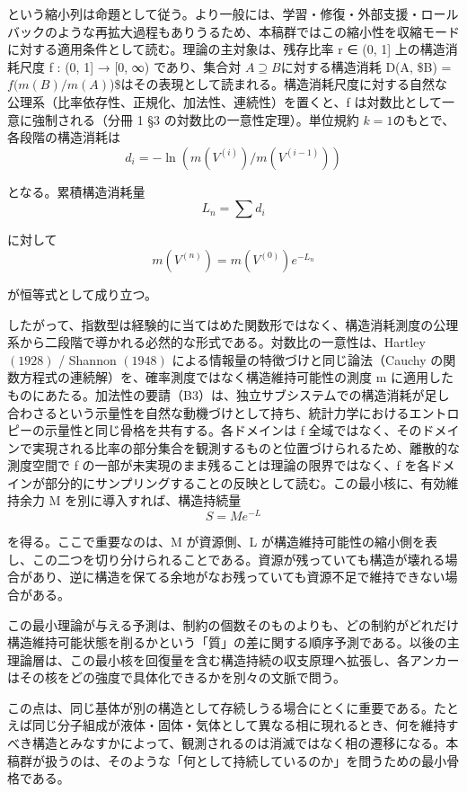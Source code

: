 \documentclass[12pt,a4paper]{article}
\begin{document}
という縮小列は命題として従う。より一般には、学習・修復・外部支援・ロールバックのような再拡大過程もありうるため、本稿群ではこの縮小性を収縮モードに対する適用条件として読む。理論の主対象は、残存比率 r ∈ (0, 1{]} 上の構造消耗尺度 f : (0, 1{]} → {[}0, ∞) であり、集合対 \(A \supseteq B\)に対する構造消耗 D(A, \$B) = \(f(m(B)/m(A)\))\$はその表現として読まれる。構造消耗尺度に対する自然な公理系（比率依存性、正規化、加法性、連続性）を置くと、f は対数比として一意に強制される（分冊 1 §3 の対数比の一意性定理）。単位規約 \(k = 1\)のもとで、各段階の構造消耗は \[
d_{i} = -\ln( m(V^{(i)}) / m(V^{(i-1)}) )
\]

となる。累積構造消耗量 \[
L_{n} = \sum d_{i}
\]

に対して \[
m(V^{(n)}) = m(V^{(0)}) e^{-L_{n}}
\]

が恒等式として成り立つ。

したがって、指数型は経験的に当てはめた関数形ではなく、構造消耗測度の公理系から二段階で導かれる必然的な形式である。対数比の一意性は、Hartley \((1928)\) / Shannon \((1948)\) による情報量の特徴づけと同じ論法（Cauchy の関数方程式の連続解）を、確率測度ではなく構造維持可能性の測度 m に適用したものにあたる。加法性の要請（B3）は、独立サブシステムでの構造消耗が足し合わさるという示量性を自然な動機づけとして持ち、統計力学におけるエントロピーの示量性と同じ骨格を共有する。各ドメインは f 全域ではなく、そのドメインで実現される比率の部分集合を観測するものと位置づけられるため、離散的な測度空間で f の一部が未実現のまま残ることは理論の限界ではなく、f を各ドメインが部分的にサンプリングすることの反映として読む。この最小核に、有効維持余力 M を別に導入すれば、構造持続量 \[
S = M e^{-L}
\]

を得る。ここで重要なのは、M が資源側、L が構造維持可能性の縮小側を表し、この二つを切り分けられることである。資源が残っていても構造が壊れる場合があり、逆に構造を保てる余地がなお残っていても資源不足で維持できない場合がある。

この最小理論が与える予測は、制約の個数そのものよりも、どの制約がどれだけ構造維持可能状態を削るかという「質」の差に関する順序予測である。以後の主理論層は、この最小核を回復量を含む構造持続の収支原理へ拡張し、各アンカーはその核をどの強度で具体化できるかを別々の文脈で問う。

この点は、同じ基体が別の構造として存続しうる場合にとくに重要である。たとえば同じ分子組成が液体・固体・気体として異なる相に現れるとき、何を維持すべき構造とみなすかによって、観測されるのは消滅ではなく相の遷移になる。本稿群が扱うのは、そのような「何として持続しているのか」を問うための最小骨格である。
\end{document}
